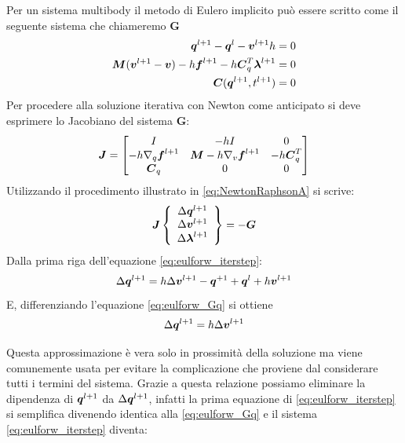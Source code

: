 Per un sistema multibody il metodo di Eulero implicito può essere scritto come il seguente sistema che chiameremo \textbf{G}
\begin{align} \label{eq:eulforw_Gq}
    {\boldsymbol{q}}^{l+1}-{\boldsymbol{q}}^l - {\boldsymbol{v}}^{l+1}h &= 0 \\ \label{eq:eulforw_Gv}
    {\boldsymbol{M}}({\boldsymbol{v}}^{l+1} -{\boldsymbol{v}}) - h{\boldsymbol{f}}^{l+1} - h{\boldsymbol{C}}_q^T {\boldsymbol{\lambda}}^{l+1} &= 0 \\ \label{eq:eulforw_Glam}
    {\boldsymbol{C}}({\boldsymbol{q}}^{l+1} , t^{l+1}) &= 0
\end{align}
Per procedere alla soluzione iterativa con Newton come anticipato si deve esprimere lo Jacobiano del sistema \textbf{G}:
\begin{equation} \label{eq:eulforwjacob} {\boldsymbol{J}} =
    \begin{bmatrix} I & -hI   & 0 \\
    -h\nabla_q{\boldsymbol{f}}^{l+1} & {\boldsymbol{M}}-h\nabla_v{\boldsymbol{f}}^{l+1} &  -h{\boldsymbol{C}}_q^T \\
    {\boldsymbol{C}}_q               &  0                                 &    0  \end{bmatrix}
\end{equation}
Utilizzando il procedimento illustrato in \ref{eq:NewtonRaphsonA} si scrive:
\begin{equation} \label{eq:eulforw_iterstep}
    {\boldsymbol{J}} \left\{\begin{array}{c}\Delta{\boldsymbol{q}}^{l+1} \\ \Delta{\boldsymbol{v}}^{l+1} 
    \\ \Delta{\boldsymbol{\lambda}}^{l+1} \end{array} \right\} = -{\boldsymbol{G}} \end{equation}
Dalla prima riga dell'equazione \ref{eq:eulforw_iterstep}:
\[ \Delta{\boldsymbol{q}}^{l+1} = h\Delta{\boldsymbol{v}}^{l+1} -{\boldsymbol{q}}^{+1} +{\boldsymbol{q}}^l + h{\boldsymbol{v}}^{l+1} \]
E, differenziando l'equazione \ref{eq:eulforw_Gq} si ottiene 
\begin{equation}
    \Delta {\boldsymbol{q}}^{l+1} = h \Delta {\boldsymbol{v}}^{l+1}
\end{equation}

Questa approssimazione è vera solo in prossimità della soluzione ma viene comunemente usata per evitare la complicazione che proviene dal considerare tutti i termini del sistema.
Grazie a questa relazione possiamo eliminare la dipendenza di ${\boldsymbol{q}}^{l+1}$ da $\Delta {\boldsymbol{q}}^{l+1}$, infatti la prima equazione di \ref{eq:eulforw_iterstep} si semplifica divenendo identica alla \ref{eq:eulforw_Gq} e il sistema \ref{eq:eulforw_iterstep} diventa: 

